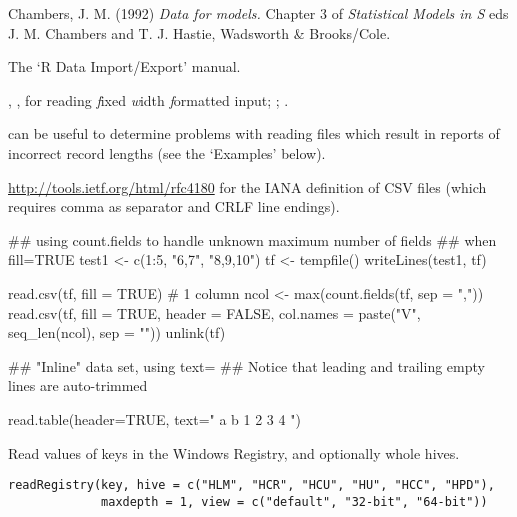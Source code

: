 %
\begin{References}\relax
Chambers, J. M. (1992)
\emph{Data for models.}
Chapter 3 of \emph{Statistical Models in S}
eds J. M. Chambers and T. J. Hastie, Wadsworth \& Brooks/Cole.
\end{References}
%
\begin{SeeAlso}\relax
The `R Data Import/Export' manual.

, ,
 for reading \emph{f}ixed \emph{w}idth
\emph{f}ormatted input;
;
.

 can be useful to determine problems with
reading files which result in reports of incorrect record lengths (see
the `Examples' below).

\url{http://tools.ietf.org/html/rfc4180} for the IANA definition of
CSV files (which requires comma as separator and CRLF line endings).
\end{SeeAlso}
%
\begin{Examples}
\begin{ExampleCode}
## using count.fields to handle unknown maximum number of fields
## when fill=TRUE
test1 <- c(1:5, "6,7", "8,9,10")
tf <- tempfile()
writeLines(test1, tf)

read.csv(tf, fill = TRUE) # 1 column
ncol <- max(count.fields(tf, sep = ","))
read.csv(tf, fill = TRUE, header = FALSE,
         col.names = paste("V", seq_len(ncol), sep = ""))
unlink(tf)

## "Inline" data set, using text=
## Notice that leading and trailing empty lines are auto-trimmed

read.table(header=TRUE, text="
a b
1 2
3 4
")
\end{ExampleCode}
\end{Examples}
%
\begin{Description}\relax
Read values of keys in the Windows Registry, and optionally whole hives.
\end{Description}
%
\begin{Usage}
\begin{verbatim}
readRegistry(key, hive = c("HLM", "HCR", "HCU", "HU", "HCC", "HPD"),
             maxdepth = 1, view = c("default", "32-bit", "64-bit"))
\end{verbatim}
\end{Usage}
